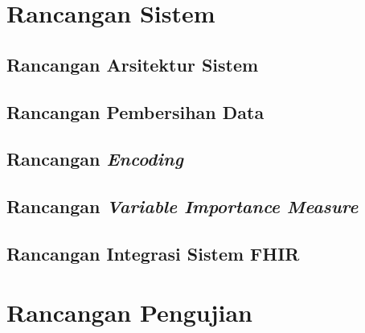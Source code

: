 \documentclass[ugmtesis]{ugmtesis}
\begin{document}
	\section{Rancangan Sistem}
	\label{rancangan sistem}
	

		\subsection{Rancangan Arsitektur Sistem}
		\label{rancangan Arsitektur Sistem}
		

		\subsection{Rancangan Pembersihan Data}
		\label{rancangan pembersihan data}
		

		\subsection{Rancangan \textit{Encoding}}
		\label{rancangan encoding}
		

		\subsection{Rancangan \textit{Variable Importance Measure}}
		\label{rancangan variable importance measure}
		

		\subsection{Rancangan Integrasi Sistem FHIR}
		\label{rancangan integrasi sistem fhir}
		

	\section{Rancangan Pengujian}
	\label{rancangan pengujian}
	




\end{document}
